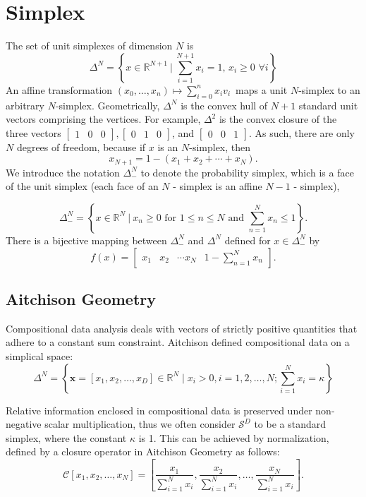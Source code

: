 \documentclass[11pt]{article}
\newcommand{\setcomp}[2]{\left\{ #1 \ \Big|\ #2 \right\}}
\begin{document}
\section{Simplex}

The set of unit simplexes of dimension $N$ is
\[
  \Delta^N = \setcomp{x \in \mathbb{R}^{N + 1}}{\sum_{i=1}^{N + 1} x_i = 1,\,x_i \ge 0 \, \, \forall i }
\]
An affine transformation $(x_0, \ldots, x_n) \mapsto \sum_{i=0}^n x_i v_i \,$ maps a unit $N$-simplex to an arbitrary $N$-simplex. Geometrically, $\Delta^N$ is the convex hull of $N+1$ standard unit vectors comprising the vertices.  For example, $\Delta^2$ is the convex closure of the three vectors
$\begin{bmatrix}1 & 0 & 0 \end{bmatrix},
\begin{bmatrix} 0 & 1 & 0 \end{bmatrix}$,
and $\begin{bmatrix} 0 & 0 & 1 \end{bmatrix}$. As such, there are only $N$ degrees of
freedom, because if $x$ is an $N$-simplex, then
\[
  x_{N+1} = 1 - (x_1 + x_2 + \cdots + x_N).
\]
We introduce the notation $\Delta^N_-$ to denote the probability simplex, which is a face of the unit simplex (each face of an $N$ - simplex is an affine $N-1$ - simplex),

\[
\Delta^N_-
= 
\setcomp{x \in \mathbb{R}^N}{x_n \geq 0 \textrm{ for } 1 \leq n \leq N \textrm{ and } \sum_{n=1}^N x_n \leq 1}.
\]
There is a bijective mapping between $\Delta^N_-$ and $\Delta^N$ defined for $x \in \Delta^N_-$ by 
\[
f(x) = \begin{bmatrix} x_1 & x_2 & \cdots x_N & 1 - \sum_{n=1}^N x_n \end{bmatrix}.
\]

\subsection{Aitchison Geometry}

Compositional data analysis deals with vectors of strictly positive quantities that adhere to a constant sum constraint. Aitchison\cite{aitchison1982statistical} defined compositional data on a simplical space:
$$
\Delta^N=\left\{\mathbf{x}=\left[x_1, x_2, \ldots, x_D\right] \in \mathbb{R}^N \mid x_i>0, i=1,2, \ldots, N ; \sum_{i=1}^N x_i=\kappa\right\}
$$

Relative information enclosed in compositional data is preserved under non-negative scalar multiplication, thus we often consider $\mathcal{S}^D$ to be a standard simplex, where the constant $\kappa$ is 1. This can be achieved by normalization, defined by a closure operator in Aitchison Geometry as follows:
$$
\mathcal{C}\left[x_1, x_2, \ldots, x_N\right]=\left[\frac{x_1}{\sum_{i=1}^N x_i}, \frac{x_2}{\sum_{i=1}^N x_i}, \ldots, \frac{x_N}{\sum_{i=1}^N x_i}\right].
$$
\end{document}
